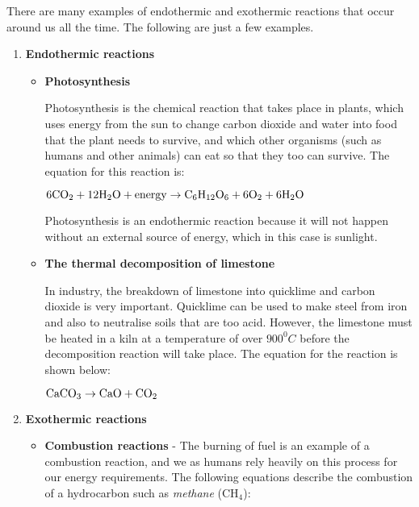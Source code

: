 There are many examples of endothermic and exothermic reactions that occur around us all the time. The following are just a few examples.

\begin{enumerate}
\item{\textbf{Endothermic reactions}

\begin{itemize}
  \item{\textbf{Photosynthesis}}

Photosynthesis is the chemical reaction that takes place in plants, which uses energy from the sun to change carbon dioxide and water into food that the plant needs to survive, and which other organisms (such as humans and other animals) can eat so that they too can survive. The equation for this reaction is:

\begin{center}
$\rm{6CO_{2} + 12H_{2}O + energy \rightarrow C_{6}H_{12}O_{6} + 6O_{2} + 6H_{2}O}$
\end{center}

Photosynthesis is an endothermic reaction because it will not happen without an external source of energy, which in this case is sunlight. \\

  \item{\textbf{The thermal decomposition of limestone}}

In industry, the breakdown of limestone into quicklime and carbon dioxide is very important. Quicklime can be used to make steel from iron and also to neutralise soils that are too acid. However, the limestone must be heated in a kiln at a temperature of over $900^{0}C$ before the decomposition reaction will take place. The equation for the reaction is shown below:

\begin{center}
$\rm{CaCO_{3} \rightarrow  CaO +  CO_{2}}$
\end{center}

\end{itemize}
}

\item{\textbf{Exothermic reactions}

\begin{itemize}
  \item{\textbf{Combustion reactions}} - The burning of fuel is an example of a combustion reaction, and we as humans rely heavily on this process for our energy requirements. The following equations describe the combustion of a hydrocarbon such as \textit{methane} (CH$_{4}$):


\end{itemize}}
\end{enumerate}
